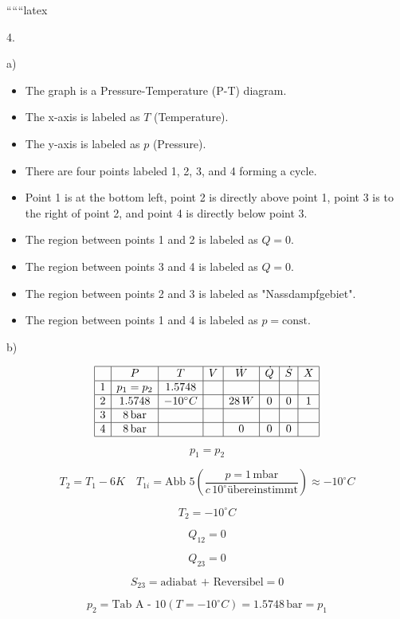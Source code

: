 
``````latex


4.

a)

\begin{itemize}
    \item The graph is a Pressure-Temperature (P-T) diagram.
    \item The x-axis is labeled as $T$ (Temperature).
    \item The y-axis is labeled as $p$ (Pressure).
    \item There are four points labeled 1, 2, 3, and 4 forming a cycle.
    \item Point 1 is at the bottom left, point 2 is directly above point 1, point 3 is to the right of point 2, and point 4 is directly below point 3.
    \item The region between points 1 and 2 is labeled as $Q = 0$.
    \item The region between points 3 and 4 is labeled as $Q = 0$.
    \item The region between points 2 and 3 is labeled as "Nassdampfgebiet".
    \item The region between points 1 and 4 is labeled as $p = \text{const}$.
\end{itemize}

b)

\[
\begin{array}{|c|c|c|c|c|c|c|c|}
\hline
 & P & T & V & \dot{W} & \dot{Q} & \dot{S} & X \\
\hline
1 & p_1 = p_2 & 1.5748 & & & & & \\
\hline
2 & 1.5748 & -10^\circ C & & 28 \, W & 0 & 0 & 1 \\
\hline
3 & 8 \, \text{bar} & & & & & & \\
\hline
4 & 8 \, \text{bar} & & & 0 & 0 & 0 & \\
\hline
\end{array}
\]

\[
p_1 = p_2
\]

\[
T_2 = T_1 - 6K \quad T_{1i} = \text{Abb 5} \left( \frac{p = 1 \, \text{mbar}}{c \, 10^\circ \text{übereinstimmt}} \right) \approx -10^\circ C
\]

\[
T_2 = -10^\circ C
\]

\[
Q_{12} = 0
\]

\[
Q_{23} = 0
\]

\[
S_{23} = \text{adiabat + Reversibel} = 0
\]

\[
p_2 = \text{Tab A - 10} \left( T = -10^\circ C \right) = 1.5748 \, \text{bar} = p_1
\]

